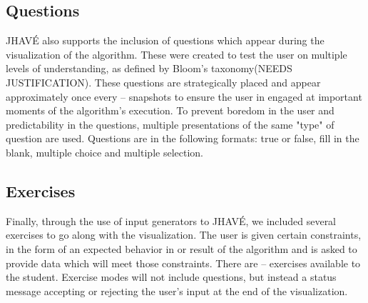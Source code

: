 \documentclass{acm_proc_article-sp}
\begin{document}
\subsection{Questions}
JHAVÉ also supports the inclusion of questions which appear during the visualization of the algorithm.
These were created to test the user on multiple levels of understanding, as defined by Bloom's taxonomy(NEEDS JUSTIFICATION).
These questions are strategically placed and appear approximately once every -- snapshots to ensure the user in engaged at important moments of the algorithm's execution.
To prevent boredom in the user and predictability in the questions, multiple presentations of the same "type" of question are used.
Questions are in the following formats: true or false, fill in the blank, multiple choice and multiple selection.
\subsection{Exercises}%
Finally, through the use of input generators to JHAVÉ, we included several exercises to go along with the visualization.
The user is given certain constraints, in the form of an expected behavior in or result of the algorithm and is asked to provide data which will meet those constraints.
There are -- exercises available to the student.
Exercise modes will not include questions, but instead a status message accepting or rejecting the user's input at the end of the visualization.

\printbibliography

\balancecolumns
\end{document}
